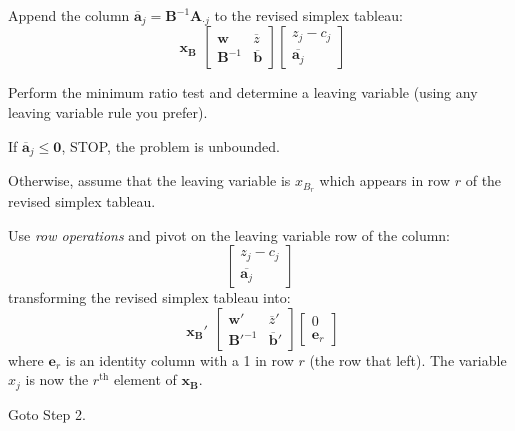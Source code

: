 \begin{algorithm}
\begin{center}
\begin{minipage}[t]{\textwidth-1em}
\begin{enumerate*}
\item Append the column $\overline{\mathbf{a}}_j = \mathbf{B}^{-1}\mathbf{A}_{\cdot j}$ to the revised simplex tableau:
\begin{displaymath}
\begin{array}{c}
\\
\mathbf{x}_\mathbf{B}
\end{array}
\left[
\begin{array}{c|c}
\mathbf{w} & \overline{z}\\
\hline
\mathbf{B}^{-1} & \overline{\mathbf{b}}
\end{array}\right]
\left[
\begin{array}{c}
z_j - c_j\\
\hline
\overline{\mathbf{a}_j}
\end{array}\right]
\end{displaymath}

\item Perform the minimum ratio test and determine a leaving variable (using any leaving variable rule you prefer). 
\begin{enumerate*}
\item If $\overline{\mathbf{a}}_j \leq \mathbf{0}$, STOP, the problem is unbounded.
\item Otherwise, assume that the leaving variable is $x_{B_r}$ which appears in row $r$ of the revised simplex tableau.
\end{enumerate*}

\item Use \textit{row operations} and pivot on the leaving variable row of the column:
\begin{displaymath}
\left[
\begin{array}{c}
z_j - c_j\\
\hline
\overline{\mathbf{a}_j}
\end{array}\right]
\end{displaymath}
transforming the revised simplex tableau into:
\begin{displaymath}
\begin{array}{c}
\\
\mathbf{x}_\mathbf{B}'
\end{array}
\left[
\begin{array}{c|c}
\mathbf{w}' & \overline{z}'\\
\hline
{\mathbf{B}'}^{-1} & \overline{\mathbf{b}}'
\end{array}\right]
\left[
\begin{array}{c}
0\\
\hline
\mathbf{e}_r
\end{array}\right]
\end{displaymath}
where $\mathbf{e}_r$ is an identity column with a 1 in row $r$ (the row that left). The variable $x_j$ is now the $r^\text{th}$ element of $\mathbf{x}_\mathbf{B}$. 

\item Goto Step 2.
\end{enumerate*}
\end{minipage}
\end{center}
\end{algorithm}
